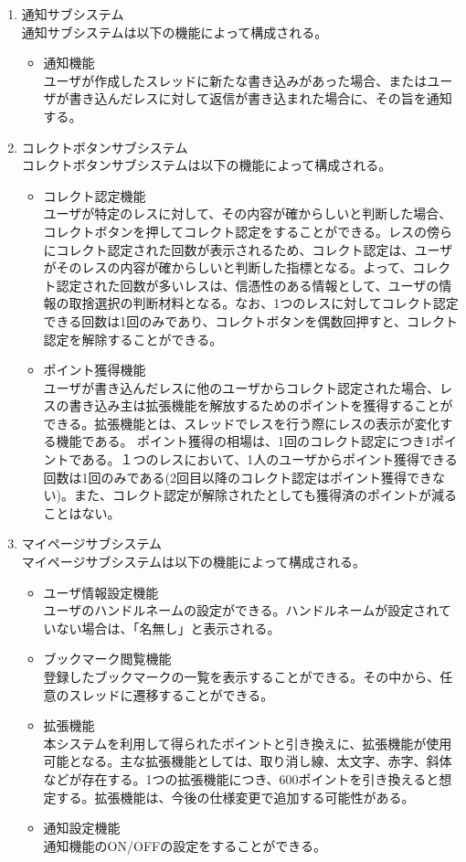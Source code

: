 \documentclass[a4j]{jarticle}
\begin{document}
\begin{enumerate}
  \item 通知サブシステム\\
  通知サブシステムは以下の機能によって構成される。
  \begin{itemize}
    \item 通知機能\\
    ユーザが作成したスレッドに新たな書き込みがあった場合、またはユーザが書き込んだレスに対して返信が書き込まれた場合に、その旨を通知する。
  \end{itemize}

  \item コレクトボタンサブシステム\\
  コレクトボタンサブシステムは以下の機能によって構成される。
  \begin{itemize}
    \item コレクト認定機能\\
    ユーザが特定のレスに対して、その内容が確からしいと判断した場合、コレクトボタンを押してコレクト認定をすることができる。レスの傍らにコレクト認定された回数が表示されるため、コレクト認定は、ユーザがそのレスの内容が確からしいと判断した指標となる。よって、コレクト認定された回数が多いレスは、信憑性のある情報として、ユーザの情報の取捨選択の判断材料となる。なお、1つのレスに対してコレクト認定できる回数は1回のみであり、コレクトボタンを偶数回押すと、コレクト認定を解除することができる。
    \item ポイント獲得機能\\
    ユーザが書き込んだレスに他のユーザからコレクト認定された場合、レスの書き込み主は拡張機能を解放するためのポイントを獲得することができる。拡張機能とは、スレッドでレスを行う際にレスの表示が変化する機能である。
    ポイント獲得の相場は、1回のコレクト認定につき1ポイントである。１つのレスにおいて、1人のユーザからポイント獲得できる回数は1回のみである(2回目以降のコレクト認定はポイント獲得できない)。また、コレクト認定が解除されたとしても獲得済のポイントが減ることはない。
  \end{itemize}

  \item マイページサブシステム\\
  マイページサブシステムは以下の機能によって構成される。
  \begin{itemize}
    \item ユーザ情報設定機能\\
    ユーザのハンドルネームの設定ができる。ハンドルネームが設定されていない場合は、「名無し」と表示される。
    \item ブックマーク閲覧機能\\
    登録したブックマークの一覧を表示することができる。その中から、任意のスレッドに遷移することができる。
    \item 拡張機能\\
    本システムを利用して得られたポイントと引き換えに、拡張機能が使用可能となる。主な拡張機能としては、取り消し線、太文字、赤字、斜体などが存在する。1つの拡張機能につき、600ポイントを引き換えると想定する。拡張機能は、今後の仕様変更で追加する可能性がある。
    \item 通知設定機能\\
    通知機能のON/OFFの設定をすることができる。
  \end{itemize}
\end{enumerate}
\end{document}
